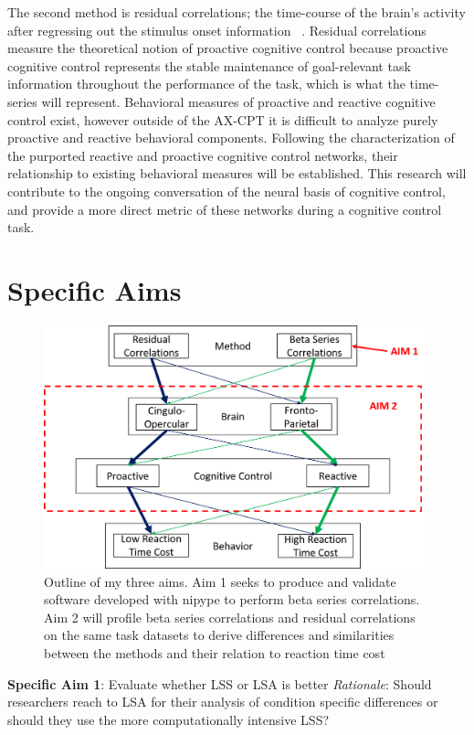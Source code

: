 \documentclass[phd,appendix,figures]{uithesis}
\begin{document}
The second method is residual correlations; the time-course of the brain's activity after regressing out the stimulus onset information ~\citep{Fair2007,Cole2014,Bolt2017}. 
Residual correlations measure the theoretical notion of proactive cognitive control because proactive cognitive control represents the stable maintenance of goal-relevant task information throughout the performance of the task, which is what the time-series will represent.
Behavioral measures of proactive and reactive cognitive control exist, however outside of the AX-CPT it is difficult to analyze purely proactive and reactive behavioral components. 
Following the characterization of the purported reactive and proactive cognitive control networks, their relationship to existing behavioral measures will be established.
This research will contribute to the ongoing conversation of the neural basis of cognitive control, and provide a more direct metric of these networks during a  cognitive control task.

\section{Specific Aims}
\begin{figure}[H]%
	\centering
	\includegraphics[width=1\linewidth]{overall_thesis_pic}
	\caption{Outline of my three aims. Aim 1 seeks to produce and validate software developed with nipype to perform beta series correlations.
	Aim 2 will profile beta series correlations and residual correlations on the same task datasets to derive differences and similarities between the methods and their relation to reaction time cost}
	\label{fig:all_aims}
\end{figure}

\textbf{Specific Aim 1}: Evaluate whether LSS or LSA is better
\newline
\newline
\textit{Rationale}: Should researchers reach to LSA for their analysis of condition specific differences
or should they use the more computationally intensive LSS?
\end{document}
